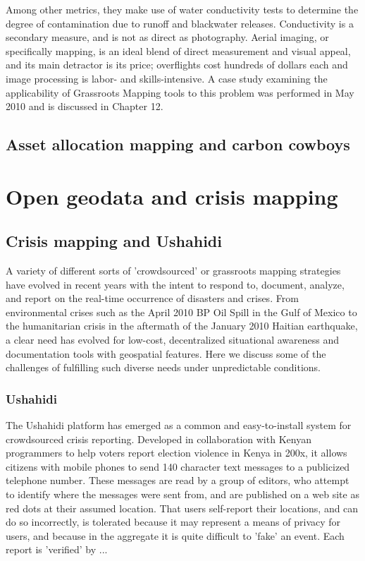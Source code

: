 \documentclass[11pt]{report}
\begin{document}
Among other metrics, they make use of water conductivity tests to determine the degree of contamination due to runoff and blackwater releases. Conductivity is a secondary measure, and is not as direct as photography. Aerial imaging, or specifically mapping, is an ideal blend of direct measurement and visual appeal, and its main detractor is its price; overflights cost hundreds of dollars each and image processing is labor- and skills-intensive. A case study examining the applicability of Grassroots Mapping tools to this problem was performed in May 2010 and is discussed in Chapter 12.

\subsection{Asset allocation mapping and carbon cowboys}

\cite{poole2006there}


\section{Open geodata and crisis mapping}
\subsection{Crisis mapping and Ushahidi}

A variety of different sorts of 'crowdsourced' or grassroots mapping strategies have evolved in recent years with the intent to respond to, document, analyze, and report on the real-time occurrence of disasters and crises. From environmental crises such as the April 2010 BP Oil Spill in the Gulf of Mexico to the humanitarian crisis in the aftermath of the January 2010 Haitian earthquake, a clear need has evolved for low-cost, decentralized situational awareness and documentation tools with geospatial features. Here we discuss some of the challenges of fulfilling such diverse needs under unpredictable conditions.

\subsubsection{Ushahidi}

The Ushahidi platform has emerged as a common and easy-to-install system for crowdsourced crisis reporting. Developed in collaboration with Kenyan programmers to help voters report election violence in Kenya in 200x, it allows citizens with mobile phones to send 140 character text messages to a publicized telephone number.\cite{okolloh2009ushahidi} These messages are read by a group of editors, who attempt to identify where the messages were sent from, and are published on a web site as red dots at their assumed location. That users self-report their locations, and can do so incorrectly, is tolerated because it may represent a means of privacy for users, and because in the aggregate it is quite difficult to 'fake' an event. Each report is 'verified' by ... 
\end{document}

